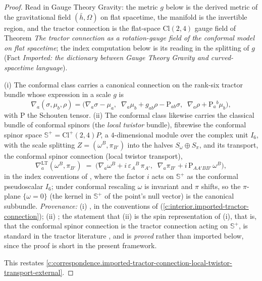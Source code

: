 \documentclass[11pt]{article}
\theoremstyle{definition}
\theoremstyle{plain}
\providecommand{\CS}{}\renewcommand{\CS}{{\mathbb{S}^{+}}}
\providecommand{\Cl}{}\renewcommand{\Cl}{\mathrm{Cl}}
\providecommand{\Som}{}\renewcommand{\Som}{S_\omega}
\providecommand{\Spi}{}\renewcommand{\Spi}{S_\pi}
\providecommand{\hb}{}\renewcommand{\hb}{\bar{h}}
\begin{document}
\begin{proof}
Read in Gauge Theory Gravity: the metric $g$ below is the derived metric of the gravitational field $(\hb, \Omega)$ on flat spacetime, the manifold is the invertible region, and the tractor connection is the flat-space $\Cl(2,4)$ gauge field of Theorem \emph{The tractor connection as a rotation-gauge field of the conformal model on flat spacetime}; the index computation below is its reading in the splitting of $g$ (Fact \emph{Imported: the dictionary between Gauge Theory Gravity and curved-spacetime language}).

(i) The conformal class carries a canonical connection on the rank-six tractor bundle whose expression in a scale $g$ is
\[
\nabla_a(\sigma, \mu_b, \rho) = \bigl(\nabla_a\sigma - \mu_a,\;\; \nabla_a\mu_b + g_{ab}\rho - \mathrm{P}_{ab}\sigma,\;\; \nabla_a\rho + \mathrm{P}_a{}^b\mu_b\bigr),
\]
with $\mathrm{P}$ the Schouten tensor. (ii) The conformal class likewise carries the classical bundle of conformal spinors (the \emph{local twistor} bundle), fibrewise the conformal spinor space $\CS = \Cl^+(2,4)P$, a $4$-dimensional module over the complex unit $I_6$, with the scale splitting $Z = (\omega^B, \pi_{B'})$ into the halves $\Som \oplus \Spi$, and its transport, the conformal spinor connection (local twistor transport),
\[
\nabla^{\mathrm{LT}}_a(\omega^B, \pi_{B'}) \;=\; \bigl(\nabla_a \omega^B + i\,\varepsilon_A{}^B\,\pi_{A'},\;\; \nabla_a\pi_{B'} + i\,\mathrm{P}_{AA'BB'}\,\omega^B\bigr),
\]
in the index conventions of \cite[Vol.~2, Ch.~6]{PenroseRindler86}, where the factor $i$ acts on $\CS$ as the conformal pseudoscalar $I_6$; under conformal rescaling $\omega$ is invariant and $\pi$ shifts, so the $\pi$-plane $\{\omega = 0\}$ (the kernel in $\CS$ of the point's null vector) is the canonical subbundle. \emph{Provenance:} (i) \cite{BEG1994, CurryGover2018}, in the conventions of \cite[Fact 4.1, eq.~(3)]{ButlerT6} (\ref{c:interior.imported-tractor-connection}); (ii) \cite{PenroseMacCallum73, Dighton74}; the statement that (ii) is the spin representation of (i), that is, that the conformal spinor connection is the tractor connection acting on $\CS$, is standard in the tractor literature \cite{BEG1994, CurryGover2018}, and is \emph{proved} rather than imported below, since the proof is short in the present framework.

This restates \ref{c:correspondence.imported-tractor-connection-local-twistor-transport-external}.

\end{proof}
\end{document}
